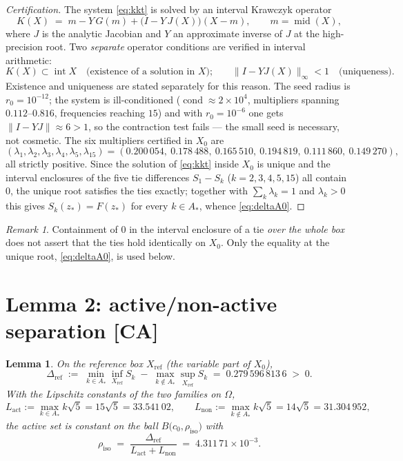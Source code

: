 \documentclass[11pt]{article}
\newtheorem{lemma}[theorem]{Lemma}
\theoremstyle{remark}
\newtheorem{remark}[theorem]{Remark}
\newcommand{\CA}{\textsf{[CA]}}
\newcommand{\Om}{\Omega}
\begin{document}
\begin{proof}[Certification]
The system \eqref{eq:kkt} is solved by an interval Krawczyk operator
\[
K(X)\;=\;m-Y\,G(m)+\bigl(I-Y\,J(X)\bigr)(X-m),\qquad m=\operatorname{mid}(X),
\]
where $J$ is the analytic Jacobian and $Y$ an approximate inverse of $J$ at the high-precision root. Two
\emph{separate} operator conditions are verified in interval arithmetic:
\[
K(X)\subset\operatorname{int}X \quad\text{(existence of a solution in $X$);}\qquad
\|I-YJ(X)\|_\infty<1 \quad\text{(uniqueness).}
\]
Existence and uniqueness are stated separately for this reason. The seed radius is $r_0=10^{-12}$; the
system is ill-conditioned ($\operatorname{cond}\approx2\times10^4$, multipliers spanning $0.112$--$0.816$,
frequencies reaching $15$) and with $r_0=10^{-6}$ one gets $\|I-YJ\|\approx6>1$, so the contraction test
fails --- the small seed is necessary, not cosmetic. The six multipliers certified in $X_0$ are
\[
(\lambda_1,\lambda_2,\lambda_3,\lambda_4,\lambda_5,\lambda_{15})
=(0.200\,054,\ 0.178\,488,\ 0.165\,510,\ 0.194\,819,\ 0.111\,860,\ 0.149\,270),
\]
all strictly positive. Since the solution of \eqref{eq:kkt} inside $X_0$ is unique and the interval
enclosures of the five tie differences $S_1-S_k$ ($k=2,3,4,5,15$) all contain $0$, the unique root
satisfies the ties exactly; together with $\sum_k\lambda_k=1$ and $\lambda_k>0$ this gives $S_k(z_*)=F(z_*)$
for every $k\in A_*$, whence \eqref{eq:deltaA0}.
\end{proof}

\begin{remark}
Containment of $0$ in the interval enclosure of a tie \emph{over the whole box} does not assert that the
ties hold identically on $X_0$. Only the equality at the unique root, \eqref{eq:deltaA0}, is used below.
\end{remark}

\section{Lemma 2: active/non-active separation \CA}\label{lem:sep}

\begin{lemma}\label{lem:sep2}
On the reference box $X_{\mathrm{ref}}$ (the variable part of $X_0$),
\begin{equation}\label{eq:Deltaref}
\Delta_{\mathrm{ref}}
\;:=\;\min_{k\in A_*}\inf_{X_{\mathrm{ref}}}S_k\;-\;\max_{k\notin A_*}\sup_{X_{\mathrm{ref}}}S_k
\;=\;0.279\,596\,813\,6 \;>\;0 .
\end{equation}
With the Lipschitz constants of the two families on $\Om$,
\[
L_{\mathrm{act}}:=\max_{k\in A_*}k\sqrt5=15\sqrt5=33.541\,02,
\qquad
L_{\mathrm{non}}:=\max_{k\notin A_*}k\sqrt5=14\sqrt5=31.304\,952,
\]
the active set is constant on the ball $B\bigl(c_0,\rho_{\mathrm{iso}}\bigr)$ with
\begin{equation}\label{eq:rhoiso}
\rho_{\mathrm{iso}}\;=\;\frac{\Delta_{\mathrm{ref}}}{L_{\mathrm{act}}+L_{\mathrm{non}}}
\;=\;4.311\,71\times10^{-3}.
\end{equation}
\end{lemma}
\end{document}
